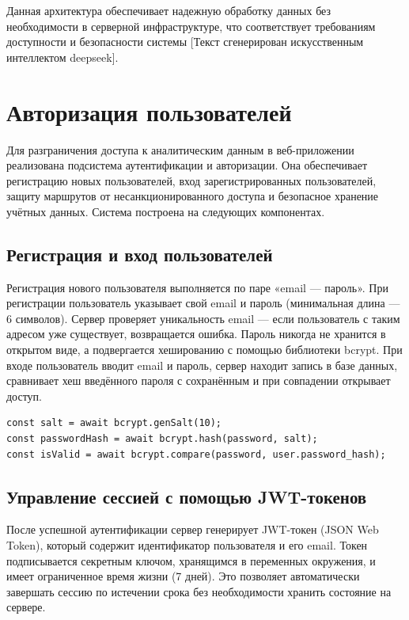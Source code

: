 Данная архитектура обеспечивает надежную обработку данных без необходимости в серверной инфраструктуре, что соответствует требованиям доступности и безопасности системы [Текст сгенерирован искусственным интеллектом deepseek].

\section{Авторизация пользователей}

Для разграничения доступа к аналитическим данным в веб-приложении реализована подсистема аутентификации и авторизации. Она обеспечивает регистрацию новых пользователей, вход зарегистрированных пользователей, защиту маршрутов от несанкционированного доступа и безопасное хранение учётных данных. Система построена на следующих компонентах.

\subsection{Регистрация и вход пользователей}

Регистрация нового пользователя выполняется по паре «email — пароль». При регистрации пользователь указывает свой email и пароль (минимальная длина — 6 символов). Сервер проверяет уникальность email — если пользователь с таким адресом уже существует, возвращается ошибка. Пароль никогда не хранится в открытом виде, а подвергается хешированию с помощью библиотеки bcrypt. При входе пользователь вводит email и пароль, сервер находит запись в базе данных, сравнивает хеш введённого пароля с сохранённым и при совпадении открывает доступ.

\begin{code}
\label{code:workWithPass}
\vspace{-0.75cm}\begin{verbatim}
const salt = await bcrypt.genSalt(10);
const passwordHash = await bcrypt.hash(password, salt);
const isValid = await bcrypt.compare(password, user.password_hash);
\end{verbatim}
\end{code}

\subsection{Управление сессией с помощью JWT-токенов}

После успешной аутентификации сервер генерирует JWT-токен (JSON Web Token), который содержит идентификатор пользователя и его email. Токен подписывается секретным ключом, хранящимся в переменных окружения, и имеет ограниченное время жизни (7 дней). Это позволяет автоматически завершать сессию по истечении срока без необходимости хранить состояние на сервере.


